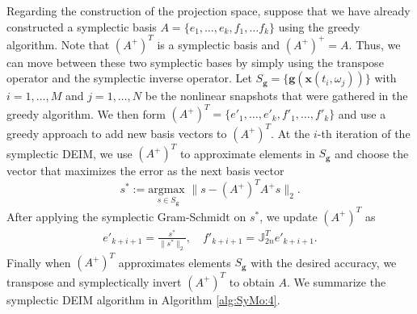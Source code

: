 \documentclass[final]{siamart}
\begin{document}
Regarding the construction of the projection space, suppose that we have already constructed a symplectic basis $A=\{ e_1,\dots , e_k,f_1,\dots f_k \}$ using the greedy algorithm. Note that $(A^+)^T$ is a symplectic basis and $(A^+)^+=A$. Thus, we can move between these two symplectic bases by simply using the transpose operator and the symplectic inverse operator. Let $S_{\mathbf g} = \{ \mathbf g (\mathbf x(t_i,\omega_j)) \}$ with $i = 1,\dots,M$ and $ j = 1 ,\dots,N$ be the nonlinear snapshots that were gathered in the greedy algorithm. We then form $(A^+)^T = \{ e'_1,\dots, e'_k,f'_1,\dots,f'_k\}$ and use a greedy approach to add new basis vectors to $(A^+)^T$. At the $i$-th iteration of the symplectic DEIM, we use $(A^+)^T$ to approximate elements in $S_{\mathbf g}$ and choose the vector that maximizes the error as the next basis vector 
\begin{equation}
	s^* := \underset{s \in S_{\mathbf g}}{\text{argmax }}\| s - (A^+)^T A^+ s \|_2.	
\end{equation}
After applying the symplectic Gram-Schmidt on $s^*$, we update $(A^+)^T$ as
\begin{equation}
\begin{aligned}
	e'_{k+i+1} = \frac{s^*}{\| s^* \|_2},\quad f'_{k+i+1} = \mathbb J_{2n}^T e'_{k+i+1}.
\end{aligned}
\end{equation}
Finally when $(A^+)^T$ approximates elements $S_{\mathbf g}$ with the desired accuracy, we transpose and symplectically invert $(A^+)^T$ to obtain $A$. We summarize the symplectic DEIM algorithm in Algorithm \ref{alg:SyMo:4}.
\end{document}
